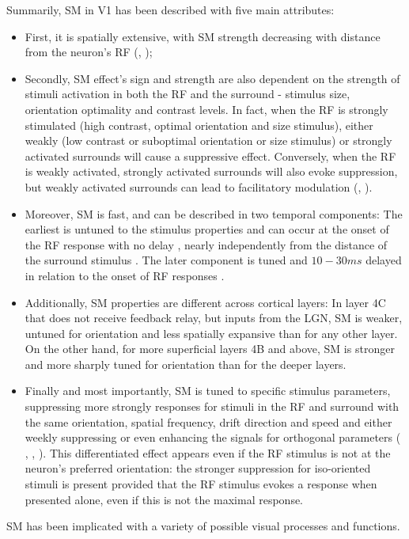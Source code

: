 Summarily, SM in V1 has been described with five main attributes: 

\begin{itemize}
\item First, it is spatially extensive, with SM strength decreasing with distance from the neuron's RF (\cite{Cavanaugh2002a}, \cite{Shushruth2009});

\item Secondly, SM effect's sign and strength are also dependent on the strength of stimuli activation in both the RF and the surround - stimulus size, orientation optimality and contrast levels. In fact, when the RF is strongly stimulated (high contrast, optimal orientation and size stimulus), either weakly (low contrast or suboptimal orientation or size stimulus) or strongly activated surrounds will cause a suppressive effect. Conversely, when the RF is weakly activated, strongly activated surrounds will also evoke suppression, but weakly activated surrounds can lead to facilitatory modulation (\cite{Ichida2007}, \cite{Shushruth2012}).

\item Moreover, SM is fast, and can be described in two temporal components: The earliest is untuned to the stimulus properties and can occur at the onset of the RF response with no delay \cite{Henry2013}, nearly independently from the distance of the surround stimulus \cite{Bair2003}. The later component is tuned and $10-30 ms$ delayed in relation to the onset of RF responses \cite{Bair2003}.

\item Additionally, SM properties are different across cortical layers: In layer 4C that does not receive feedback relay, but inputs from the LGN, SM is weaker, untuned for orientation and less spatially expansive than for any other layer. On the other hand, for more superficial layers 4B and above, SM is stronger and more sharply tuned for orientation than for the deeper layers.

\item Finally and most importantly, SM is tuned to specific stimulus parameters, suppressing more strongly responses for stimuli in the RF and surround with the same orientation, spatial frequency, drift direction and speed and either weekly suppressing or even enhancing the signals for orthogonal parameters ( \cite{Cavanaugh2002a}, \cite{Henry2013}, \cite{Self2014}). This differentiated effect appears even if the RF stimulus is not at the neuron's preferred orientation: the stronger suppression for iso-oriented stimuli is present provided that the RF stimulus evokes a response when presented alone, even if this is not the maximal response.

\end{itemize}
SM has been implicated with a variety of possible visual processes and functions.

